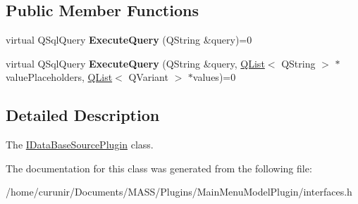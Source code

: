 \subsection*{Public Member Functions}
\begin{DoxyCompactItemize}
\item 
virtual Q\+Sql\+Query {\bfseries Execute\+Query} (Q\+String \&query)=0\hypertarget{class_i_data_base_source_plugin_a4ec8ebd5229431cf3b87548f258960b8}{}\label{class_i_data_base_source_plugin_a4ec8ebd5229431cf3b87548f258960b8}

\item 
virtual Q\+Sql\+Query {\bfseries Execute\+Query} (Q\+String \&query, \hyperlink{class_q_list}{Q\+List}$<$ Q\+String $>$ $\ast$value\+Placeholders, \hyperlink{class_q_list}{Q\+List}$<$ Q\+Variant $>$ $\ast$values)=0\hypertarget{class_i_data_base_source_plugin_a0f7fce934bf41f5f18c52951a7eb179c}{}\label{class_i_data_base_source_plugin_a0f7fce934bf41f5f18c52951a7eb179c}

\end{DoxyCompactItemize}


\subsection{Detailed Description}
The \hyperlink{class_i_data_base_source_plugin}{I\+Data\+Base\+Source\+Plugin} class. 

The documentation for this class was generated from the following file\+:\begin{DoxyCompactItemize}
\item 
/home/curunir/\+Documents/\+M\+A\+S\+S/\+Plugins/\+Main\+Menu\+Model\+Plugin/interfaces.\+h\end{DoxyCompactItemize}
